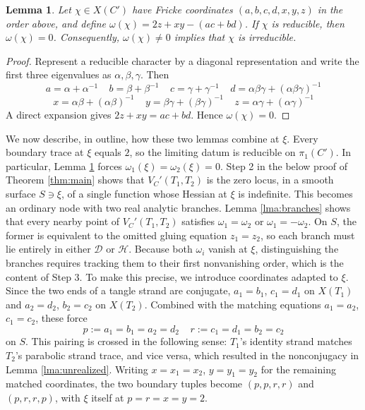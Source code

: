 \documentclass{article}
\theoremstyle{plain}
\theoremstyle{definition}
\theoremstyle{plain}
\theoremstyle{plain}
\theoremstyle{plain}
\newtheorem{lemma}[theorem]{Lemma}
\theoremstyle{remark}
\theoremstyle{remark}
\theoremstyle{plain}
\theoremstyle{plain}
\newcounter{main}
\theoremstyle{plain}
\theoremstyle{plain}
\begin{document}
\begin{lemma}\label{lma:boundary-discriminant}
Let $\chi\in X(C')$ have Fricke coordinates $(a, b, c, d, x, y, z)$ in the order above, and define $\omega(\chi) = 2z+xy-(ac+bd)$. If $\chi$ is reducible, then $\omega(\chi)=0$. Consequently, $\omega(\chi)\neq0$ implies that $\chi$ is irreducible.
\end{lemma}

\begin{proof}
Represent a reducible character by a diagonal representation and write the first three eigenvalues as $\alpha, \beta, \gamma$. Then
\begin{equation*}
	a = \alpha+\alpha^{-1} \ \ \ \ \ b=\beta+\beta^{-1} \ \ \ \ \ c=\gamma+\gamma^{-1} \ \ \ \ \ d=\alpha\beta\gamma+(\alpha\beta\gamma)^{-1}
\end{equation*}
\begin{equation*}
	x=\alpha\beta+(\alpha\beta)^{-1} \ \ \ \ \ y=\beta\gamma+(\beta\gamma)^{-1} \ \ \ \ \ z=\alpha\gamma+(\alpha\gamma)^{-1}
\end{equation*}
A direct expansion gives $2z + xy = ac + bd$. Hence $\omega(\chi) = 0$. 
\end{proof}

We now describe, in outline, how these two lemmas combine at $\xi$. Every boundary trace at $\xi$ equals $2$, so the limiting datum is reducible on $\pi_1(C')$. In particular, Lemma \ref{lma:boundary-discriminant} forces $\omega_1(\xi) = \omega_2(\xi) = 0$. Step 2 in the below proof of Theorem \ref{thm:main} shows that $V_C'(T_1, T_2)$ is the zero locus, in a smooth surface $S \ni \xi$, of a single function whose Hessian at $\xi$ is indefinite. This becomes an ordinary node with two real analytic branches. Lemma \ref{lma:branches} shows that every nearby point of $V_C'(T_1, T_2)$ satisfies $\omega_1 = \omega_2$ or $\omega_1 = -\omega_2$. On $S$, the former is equivalent to the omitted gluing equation $z_1 = z_2$, so each branch must lie entirely in either $\mathcal D$ or $\mathcal H$. Because both $\omega_i$ vanish at $\xi$, distinguishing the branches requires tracking them to their first nonvanishing order, which is the content of Step 3. To make this precise, we introduce coordinates adapted to $\xi$. Since the two ends of a tangle strand are conjugate, $a_1 = b_1$, $c_1 = d_1$ on $X(T_1)$ and $a_2 = d_2$, $b_2 = c_2$ on $X(T_2)$. Combined with the matching equations $a_1 = a_2$, $c_1 = c_2$, these force 
\begin{equation*}
	p := a_1 = b_1 = a_2 = d_2 \ \ \ \ \ r := c_1 = d_1 = b_2 = c_2
\end{equation*}
on $S$. This pairing is crossed in the following sense: $T_1$'s identity strand matches $T_2$'s parabolic strand trace, and vice versa, which resulted in the nonconjugacy in Lemma \ref{lma:unrealized}. Writing $x = x_1 = x_2$, $y = y_1 = y_2$ for the remaining matched coordinates, the two boundary tuples become $(p, p, r, r)$ and $(p, r, r, p)$, with $\xi$ itself at $p = r = x = y = 2$. 
\end{document}
